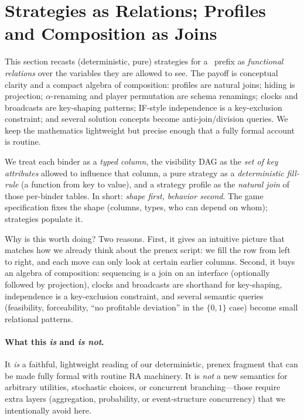 \section{Strategies as Relations; Profiles and Composition as Joins}
\label{sec:ra-view}

This section recasts (deterministic, pure) strategies for a \KFOL\ prefix as
\emph{functional relations} over the variables they are allowed to see.  The
payoff is conceptual clarity and a compact algebra of composition: profiles
are natural joins; hiding is projection; $\alpha$-renaming and player
permutation are schema renamings; clocks and broadcasts are key-shaping
patterns; IF-style independence is a key-exclusion constraint; and several
solution concepts become anti-join/division queries.  We keep the mathematics
lightweight but precise enough that a fully formal account is routine.

We treat each binder as a \emph{typed column}, the visibility DAG as the
\emph{set of key attributes} allowed to influence that column, a pure strategy
as a \emph{deterministic fill-rule} (a function from key to value), and a
strategy profile as the \emph{natural join} of those per-binder tables.  In
short: \emph{shape first, behavior second}.  The game specification fixes the
shape (columns, types, who can depend on whom); strategies populate it.

Why is this worth doing?  Two reasons.  First, it gives an intuitive picture
that matches how we already think about the prenex script: we fill the row
from left to right, and each move can only look at certain earlier columns.
Second, it buys an algebra of composition: sequencing is a join on an
interface (optionally followed by projection), clocks and broadcasts are
shorthand for key-shaping, independence is a key-exclusion constraint, and
several semantic queries (feasibility, forceability, ``no profitable
deviation'' in the $\{0,1\}$ case) become small relational patterns.

\paragraph{What this \emph{is} and \emph{is not}.}
It \emph{is} a faithful, lightweight reading of our deterministic, prenex
fragment that can be made fully formal with routine RA machinery.  It is
\emph{not} a new semantics for arbitrary utilities, stochastic choices, or
concurrent branching---those require extra layers (aggregation, probability,
or event-structure concurrency) that we intentionally avoid here.

